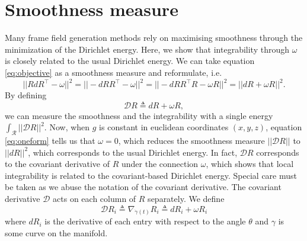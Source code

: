 \documentclass[../thesis.tex]{subfiles}
\begin{document}
\section{Smoothness measure}
Many frame field generation methods rely on maximising smoothness through
the minimization of the Dirichlet energy.
Here, we show that integrability through $\omega$ is closely related to the usual
Dirichlet energy.
We can take equation \ref{eq:objective} as a smoothness measure and reformulate, i.e.
\begin{equation}\label{eq:smoothness}
  ||RdR^{\top}-\omega||^2 = ||-dRR^{\top} - \omega||^2 = ||-dRR^{\top}R-\omega R||^2 = ||dR+ \omega R||^2.
\end{equation}
By defining
\begin{equation}
  \mathcal{D}R \triangleq dR + \omega R,
\end{equation}
we can measure the smoothness and the integrability with a single energy $\int_{\mathcal{R}}||\mathcal{D}R||^2$.
Now, when $g$ is constant in euclidean coordinates $(x,y,z)$, equation \ref{eq:oneform} tells us
that $\omega = 0$, which reduces the smoothness measure $||\mathcal{D}R||$ to 
$||dR||^2$, which corresponds to the usual Dirichlet energy.
In fact, $\mathcal{D}R$ corresponds to the covariant derivative of $R$ under
the connection $\omega$, which shows that local integrability is related
to the covariant-based Dirichlet energy.
Special care must be taken as we abuse the notation of the covariant derivative. The
covariant derivative $\mathcal{D}$ acts on each column of $R$ separately.
We define 
$$\mathcal{D}R_i \triangleq \nabla_{\dot{\gamma}(t)}R_i \triangleq dR_i + \omega R_i$$
where $dR_i$ is the derivative of each entry with respect to the angle $\theta$ and $\gamma$ is some curve on the manifold.
\end{document}
